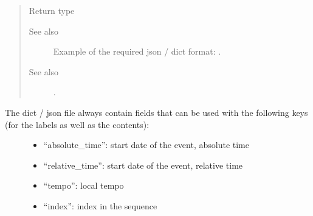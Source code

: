 \documentclass[letterpaper,10pt,english]{sphinxmanual}
\begin{document}
\begin{fulllineitems}
\begin{quote}
\begin{description}
\item[{Return type}] \leavevmode
{\hyperref[\detokenize{index:Generator.GenerationHandler}]{}}

\item[{See also}] \leavevmode
Example of the required json / dict format: .

\item[{See also}] \leavevmode
{} .

\end{description}\end{quote}
\begin{description}
\item[{The dict / json file always contain fields that can be used with the following keys (for the labels as well as the contents):}] \leavevmode\begin{itemize}
\item {} 
“absolute\_time”: start date of the event, absolute time

\item {} 
“relative\_time”: start date of the event, relative time

\item {} 
“tempo”: local tempo

\item {} 
“index”: index in the sequence

\end{itemize}

\end{description}

\end{fulllineitems}

\end{document}
